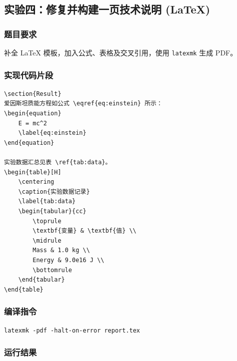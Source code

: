 \documentclass[12pt,a4paper]{article}
\begin{document}
\newpage
\subsection{实验四：修复并构建一页技术说明 (LaTeX)}

\subsubsection{题目要求}
补全 LaTeX 模板，加入公式、表格及交叉引用，使用 \texttt{latexmk} 生成 PDF。

\subsubsection{实现代码片段}
\begin{lstlisting}[caption={report.tex 关键片段}]
\section{Result}
爱因斯坦质能方程如公式 \eqref{eq:einstein} 所示：
\begin{equation}
    E = mc^2
    \label{eq:einstein}
\end{equation}

实验数据汇总见表 \ref{tab:data}。
\begin{table}[H]
    \centering
    \caption{实验数据记录}
    \label{tab:data}
    \begin{tabular}{cc}
        \toprule
        \textbf{变量} & \textbf{值} \\
        \midrule
        Mass & 1.0 kg \\
        Energy & 9.0e16 J \\
        \bottomrule
    \end{tabular}
\end{table}
\end{lstlisting}

\subsubsection{编译指令}
\begin{lstlisting}[caption={编译命令}]
latexmk -pdf -halt-on-error report.tex
\end{lstlisting}

\subsubsection{运行结果}
\end{document}
